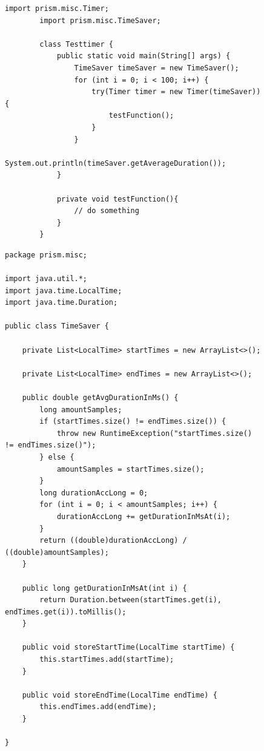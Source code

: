 \documentclass[preview]{standalone}
\begin{document}
\begin{figure}[!htb]
	\begin{lstlisting}[style=javaStyle, caption={Example for measuring time with Timer}]
		import prism.misc.Timer;
		import prism.misc.TimeSaver;
		
		class Testtimer {
			public static void main(String[] args) {				
				TimeSaver timeSaver = new TimeSaver();				
				for (int i = 0; i < 100; i++) {
					try(Timer timer = new Timer(timeSaver)) {
						testFunction();
					}
				}			
				System.out.println(timeSaver.getAverageDuration());				
			}
			
			private void testFunction(){
				// do something
			}
		}
	\end{lstlisting}
\end{figure}

\begin{figure}
\begin{lstlisting}[style=javaStyle, caption={TimeSaver.java}]		
package prism.misc;

import java.util.*;
import java.time.LocalTime;
import java.time.Duration;

public class TimeSaver {
	
	private List<LocalTime> startTimes = new ArrayList<>();
	
	private List<LocalTime> endTimes = new ArrayList<>();
	
	public double getAvgDurationInMs() {
		long amountSamples;
		if (startTimes.size() != endTimes.size()) {
			throw new RuntimeException("startTimes.size() != endTimes.size()");
		} else {
			amountSamples = startTimes.size();
		}
		long durationAccLong = 0;
		for (int i = 0; i < amountSamples; i++) {
			durationAccLong += getDurationInMsAt(i);
		}
		return ((double)durationAccLong) / ((double)amountSamples);
	}
	
	public long getDurationInMsAt(int i) {
		return Duration.between(startTimes.get(i), endTimes.get(i)).toMillis();
	}
	
	public void storeStartTime(LocalTime startTime) {
		this.startTimes.add(startTime);
	}
	
	public void storeEndTime(LocalTime endTime) {
		this.endTimes.add(endTime);
	}

}
\end{lstlisting}
\end{figure}
\end{document}
